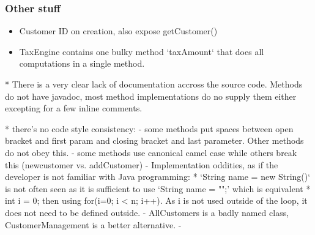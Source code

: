 \subsubsection{Other stuff}

\begin{itemize}
	 \item Customer ID on creation, also expose getCustomer() 


	 \item TaxEngine contains one bulky method `taxAmount` that does all computations in a single method. 
\end{itemize}



* There is a very clear lack of documentation accross the source code. Methods do not have javadoc, most method implementations do no supply them either excepting for a few inline comments. 

* there's no code style consistency: 
	- some methods put spaces between open bracket and first param and closing bracket and last parameter. Other methods do not obey this. 
	- some methods use canonical camel case while others break this (newcustomer vs. addCustomer)
	- Implementation oddities, as if the developer is not familiar with Java programming: 
		* `String name = new String()` is not often seen as it is sufficient to use `String name = "";' which is equivalent
		* int i = 0; then using for(i=0; i < n; i++). As i is not used outside of the loop, it does not need to be defined outside. 
	- AllCustomers is a badly named class, CustomerManagement is a better alternative. 
	- 

